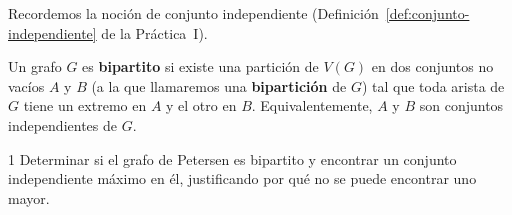 Recordemos la noción de conjunto independiente (Definición~\ref{def:conjunto-independiente} de la Práctica~I).

\begin{definition}
    Un grafo \( G \) es \textbf{bipartito} si existe una partición de \( V(G) \) en dos conjuntos no vacíos \( A \) y \( B \) (a la que llamaremos una \textbf{bipartición} de \( G \)) tal que toda arista de \( G \) tiene un extremo en \( A \) y el otro en \( B \). Equivalentemente, \( A \) y \( B \) son conjuntos independientes de \( G \).
\end{definition}

\begin{ejercicio}{1}
    Determinar si el grafo de Petersen es bipartito y encontrar un conjunto independiente máximo en él, justificando por qué no se puede encontrar uno mayor.
\end{ejercicio}
